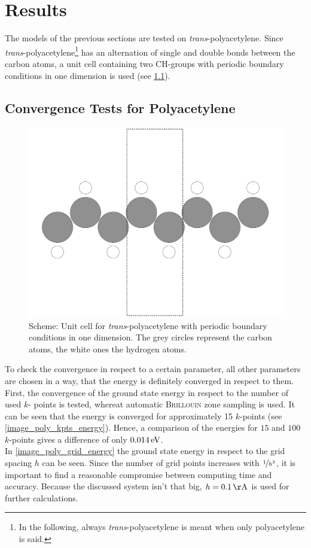 \chapter{Results}
The models of the previous sections are tested on \linebreak\emph{trans}-polyacetylene. Since \emph{trans}-polyacetylene\footnote{In the following, always \emph{trans}-polyacetylene is meant when only polyacetylene is said.} has an alternation of single and double bonds between the carbon atoms, a unit cell containing two CH-groups with periodic boundary conditions in one dimension is used (see \cref{image_scheme_polyacetylene_unit_cell}). 

\section{Convergence Tests for Polyacetylene}
\begin{figure}[]
	\centering
	\includegraphics[width = .5\textwidth]{Images/polyacetylene/convergence/polyacetylene_nice_unit_cell}
	\caption{Scheme: Unit cell for \emph{trans}-polyacetylene with periodic boundary conditions in one dimension. The grey circles represent the carbon atoms, the white ones the hydrogen atoms.}
	\label{image_scheme_polyacetylene_unit_cell}
\end{figure}
To check the convergence in respect to a certain parameter, all other parameters are chosen in a way, that the energy is definitely converged in respect to them.\\
First, the convergence of the ground state energy in respect to the number of used $k$- points is tested, whereat automatic \textsc{Brillouin} zone sampling is used. It can be seen that the energy is converged for approximately 15 $k$-points (see \cref{image_poly_kpts_energy}). Hence, a comparison of the energies for $15$ and $100$ $k$-points gives a difference of only $\unit[0.014]{eV}$.\\
In \cref{image_poly_grid_energy} the ground state energy in respect to the grid spacing $h$ can be seen. Since the number of grid points increases with $\nicefrac{1}{h^3}$, it is important to find a reasonable compromise between computing time and accuracy. Because the discussed system isn't that big, $h = \unit[0.1]{\AA}$ is used for further calculations.\\
